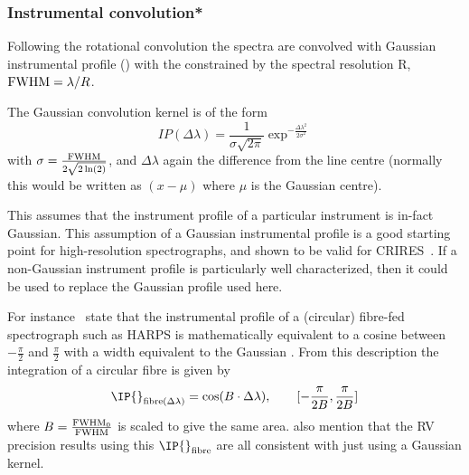 \subsubsection{Instrumental convolution*}
Following the rotational convolution the spectra are convolved with Gaussian instrumental profile ({\IP{}}) with the {\fwhm}  constrained by the spectral resolution R, $\textrm{FWHM}= \lambda/R$.

The Gaussian convolution kernel is of the form
\begin{equation}
IP(\Delta\lambda) = \frac{1}{\sigma \sqrt{2\pi}} \exp^{-\frac{{\Delta\lambda}^{2}}{2 {\sigma}^{2}}}
\label{eqn:IP_profile}
\end{equation}
with $\sigma = \frac{\textrm{FWHM}}{2\sqrt{2 \ln(2)}}$, and $\Delta \lambda$ again the difference from the line centre (normally this would be written as $(x-\mu)$ where $\mu$ is the Gaussian centre).

This assumes that the instrument profile of a particular instrument is in-fact Gaussian.
This assumption of a Gaussian instrumental profile is a good starting point for high-resolution spectrographs, and shown to be valid for CRIRES~\citep{seifahrt_synthesising_2010}.
If a non-Gaussian instrument profile is particularly well characterized, then it could be used to replace the Gaussian profile used here.

For instance~\citet{artigau_optical_2018} state that the instrumental profile of a (circular) fibre-fed spectrograph such as {HARPS} is mathematically equivalent to a cosine between $-\frac{\pi}{2}$ and $\frac{\pi}{2}$ with a width equivalent to the Gaussian {\fwhm}.
From this description the integration of a circular fibre is given by
\begin{equation}
\IP{}_{\textrm{fibre}(\Delta\lambda)} = \cos(B\cdot\Delta\lambda) ,  \hspace{2em} [-\frac{\pi}{2 B}, \frac{\pi}{2 B}]
\end{equation}
where {$B = \frac{\textrm{FWHM}_{0}}{\textrm{FWHM}}$ } is scaled to give the same area.
\citet{artigau_optical_2018} also mention that the RV precision results using this $\IP{}_{\textrm{fibre}}$ are all consistent with just using a Gaussian kernel.

